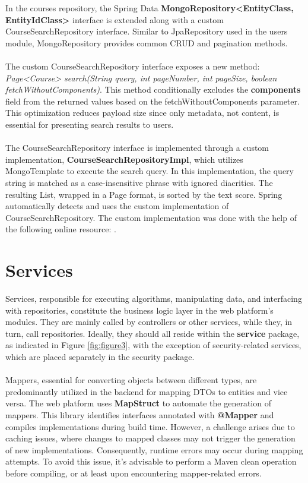 \noindent In the courses repository, the Spring Data \textbf{MongoRepository<EntityClass, EntityIdClass>} interface is extended along with a custom CourseSearchRepository interface. Similar to JpaRepository used in the users module, MongoRepository provides common CRUD and pagination methods.
\\\\
\noindent The custom CourseSearchRepository interface exposes a new method: \textit{Page<Course> search(String query, int pageNumber, int pageSize, boolean fetchWithoutComponents)}. This method conditionally excludes the \textbf{components} field from the returned values based on the fetchWithoutComponents parameter. This optimization reduces payload size since only metadata, not content, is essential for presenting search results to users.
\\\\
\noindent The CourseSearchRepository interface is implemented through a custom implementation, \textbf{CourseSearchRepositoryImpl}, which utilizes MongoTemplate to execute the search query. In this implementation, the query string is matched as a case-insensitive phrase with ignored diacritics. The resulting List, wrapped in a Page format, is sorted by the text score. Spring automatically detects and uses the custom implementation of CourseSearchRepository. The custom implementation was done with the help of the following online resource: \cite{mongodb-custom-repositories}.

\section{Services}

Services, responsible for executing algorithms, manipulating data, and interfacing with repositories, constitute the business logic layer in the web platform's modules. They are mainly called by controllers or other services, while they, in turn, call repositories. Ideally, they should all reside within the \textbf{service} package, as indicated in Figure \ref{fig:figure3}, with the exception of security-related services, which are placed separately in the security package.
\\\\
\noindent Mappers, essential for converting objects between different types, are predominantly utilized in the backend for mapping DTOs to entities and vice versa. The web platform uses \textbf{MapStruct} to automate the generation of mappers. This library identifies interfaces annotated with \textbf{@Mapper} and compiles implementations during build time. However, a challenge arises due to caching issues, where changes to mapped classes may not trigger the generation of new implementations. Consequently, runtime errors may occur during mapping attempts. To avoid this issue, it's advisable to perform a Maven clean operation before compiling, or at least upon encountering mapper-related errors.

